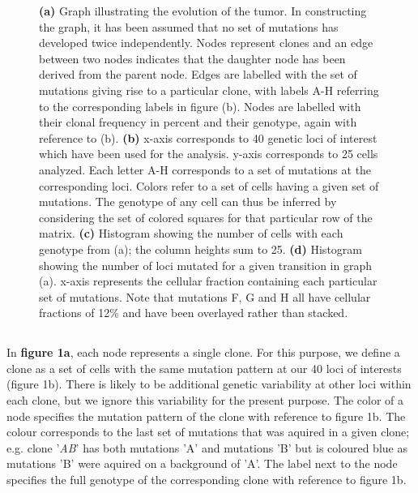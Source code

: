 \documentclass{article}
\begin{document}
\begin{figure}[h]
\caption{
\textbf{(a)} Graph illustrating the evolution of the tumor. In constructing the graph, it has been assumed that no set of mutations has developed twice independently. Nodes represent clones and an edge between two nodes indicates that the daughter node has been derived from the parent node. Edges are labelled with the set of mutations giving rise to a particular clone, with labels A-H referring to the corresponding labels in figure (b). Nodes are labelled with their clonal frequency in percent and their genotype, again with reference to (b). \textbf{(b)} x-axis corresponds to 40 genetic loci of interest which have been used for the analysis. y-axis corresponds to 25 cells analyzed. Each letter A-H corresponds to a set of mutations at the corresponding loci. Colors refer to a set of cells having a given set of mutations. The genotype of any cell can thus be inferred by considering the set of colored squares for that particular row of the matrix. \textbf{(c)} Histogram showing the number of cells with each genotype from (a); the column heights sum to 25. \textbf{(d)} Histogram showing the number of loci mutated for a given transition in graph (a). x-axis represents the cellular fraction containing each particular set of mutations. Note that mutations F, G and H all have cellular fractions of 12\% and have been overlayed rather than stacked.
}
\end{figure}

\newpage



\setcounter{section}{2}

\subsection{}

In \textbf{figure 1a}, each node represents a single clone. For this purpose, we define a clone as a set of cells with the same mutation pattern at our 40 loci of interests (figure 1b). There is likely to be additional genetic variability at other loci within each clone, but we ignore this variability for the present purpose. The color of a node specifies the mutation pattern of the clone with reference to figure 1b. The colour corresponds to the last set of mutations that was aquired in a given clone; e.g. clone '\textit{AB}' has both mutations 'A' and mutations 'B' but is coloured blue as mutations 'B' were aquired on a background of 'A'. The label next to the node specifies the full genotype of the corresponding clone with reference to figure 1b.
\end{document}
